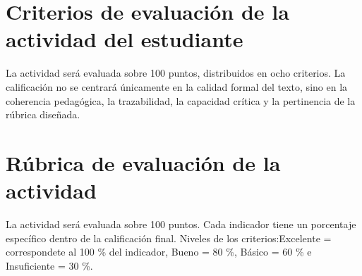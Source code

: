 \documentclass[12pt,letterpaper]{article}
\begin{document}
\section{Criterios de evaluación de la actividad del estudiante}

La actividad será evaluada sobre 100 puntos, distribuidos en ocho
criterios. La calificación no se centrará únicamente en la calidad
formal del texto, sino en la coherencia pedagógica, la trazabilidad,
la capacidad crítica y la pertinencia de la rúbrica diseñada.

\section{Rúbrica de evaluación de la actividad}

La actividad será evaluada sobre 100 puntos. Cada indicador tiene un
porcentaje específico dentro de la calificación final. Niveles de los
criterios:Excelente =
correspondete al 100 \% del indicador, Bueno = 80 \%, Básico = 60 \%
e Insuficiente = 30 \%.
\clearpage
\end{document}
